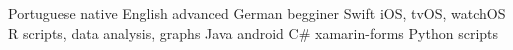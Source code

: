 \begin{cvskills}
  \cvskill
    {Portuguese}
    {native}
  \cvskill
    {English}
    {advanced}
  \cvskill
    {German}
    {begginer}
  \cvskill
    {Swift}
    {iOS, tvOS, watchOS}
    \cvskill
    {R}
    {scripts, data analysis, graphs}
  \cvskill
    {Java}
    {android}
  \cvskill
    {C\#}
    {xamarin-forms}
  \cvskill
    {Python}
    {scripts}
\end{cvskills}
